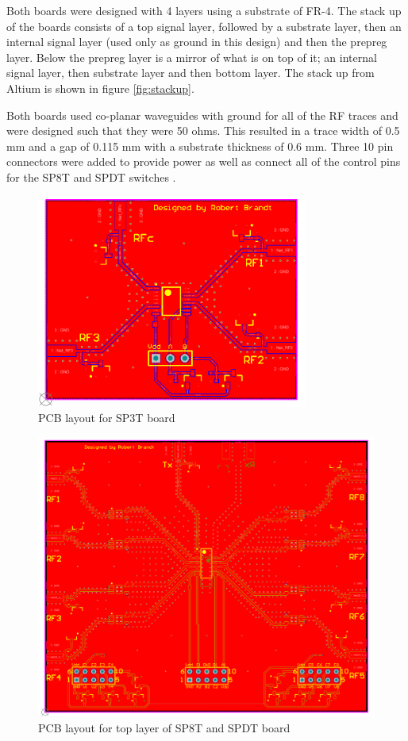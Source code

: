 Both boards were designed with 4 layers using a substrate of FR-4. The stack up of the boards consists of a top signal layer, followed by a substrate layer, then an internal signal layer (used only as ground in this design) and then the prepreg layer. Below the prepreg layer is a mirror of what is on top of it; an internal signal layer, then substrate layer and then bottom layer. The stack up from Altium is shown in figure \ref{fig:stackup}. 

Both boards used co-planar waveguides with ground for all of the RF traces and were designed such that they were 50 ohms. This resulted in a trace width of 0.5 mm and a gap of 0.115 mm with a substrate thickness of 0.6 mm. Three 10 pin connectors were added to provide power as well as connect all of the control pins for the SP8T and SPDT switches \cite{rob1}.

 
\begin{figure}[h]
	\begin{center}
		\includegraphics[width=3.5in]{./images/sp3t.png}
		\caption{PCB layout for SP3T board}
		\label{fig:sp3t}
	\end{center}
\end{figure}

\begin{figure}[h]
	\begin{center}
		\includegraphics[width=5.5in]{./images/sp8t_top.png}
		\caption{PCB layout for top layer of SP8T and SPDT board}
		\label{fig:sp8t_top}
	\end{center}
\end{figure}


